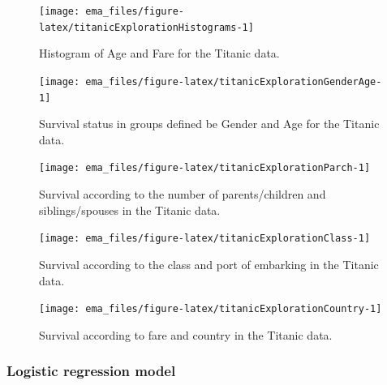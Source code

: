 \documentclass[12pt,]{krantz}
\begin{document}
\begin{figure}

{\centering \texttt{[image: ema\_files/figure-latex/titanicExplorationHistograms-1]} 

}

\caption{Histogram of Age and Fare for the Titanic data.}\label{fig:titanicExplorationHistograms}
\end{figure}

\begin{figure}

{\centering \texttt{[image: ema\_files/figure-latex/titanicExplorationGenderAge-1]} 

}

\caption{Survival status in groups defined be Gender and Age for the Titanic data.}\label{fig:titanicExplorationGenderAge}
\end{figure}

\begin{figure}

{\centering \texttt{[image: ema\_files/figure-latex/titanicExplorationParch-1]} 

}

\caption{Survival according to the number of parents/children and siblings/spouses in the Titanic data.}\label{fig:titanicExplorationParch}
\end{figure}

\begin{figure}

{\centering \texttt{[image: ema\_files/figure-latex/titanicExplorationClass-1]} 

}

\caption{Survival according to the class and port of embarking in the Titanic data.}\label{fig:titanicExplorationClass}
\end{figure}

\begin{figure}

{\centering \texttt{[image: ema\_files/figure-latex/titanicExplorationCountry-1]} 

}

\caption{Survival according to fare and country in the Titanic data.}\label{fig:titanicExplorationCountry}
\end{figure}

\hypertarget{model-titanic-lmr}{%
\subsubsection{Logistic regression model}\label{model-titanic-lmr}}
\end{document}
